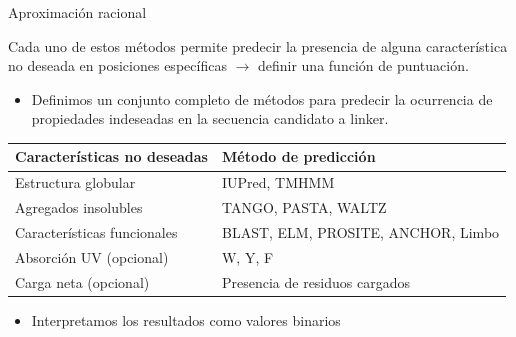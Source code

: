 \documentclass{beamer}
\begin{document}

% 

\begin{frame}{Aproximación racional}
 

Cada uno de estos métodos permite predecir la presencia de alguna característica no deseada en posiciones específicas $\rightarrow$ definir una función de puntuación.
\vspace{10px}

\begin{itemize}
 \item Definimos un conjunto completo de métodos para predecir la ocurrencia de propiedades indeseadas en la secuencia candidato a linker.
\end{itemize}

\vspace{10px} 

\begin{adjustbox}{width=\textwidth}
\begin{tabular}{l|l}
\textbf{Características no deseadas} & \textbf{Método de predicción} \\ \hline \hline
\rowcolor{Gray} Estructura globular & IUPred, TMHMM \\
Agregados insolubles  & TANGO, PASTA, WALTZ   \\
\rowcolor{Gray}Características funcionales & BLAST, ELM, PROSITE, ANCHOR, Limbo \\  
Absorción UV (opcional) & W, Y, F \\ %
\rowcolor{Gray}Carga neta (opcional)& Presencia de residuos cargados\\
\end{tabular}
\end{adjustbox}

\vspace{10px}
\begin{itemize}
 \item Interpretamos los resultados como valores binarios 
\end{itemize}

\end{frame}
\end{document}
